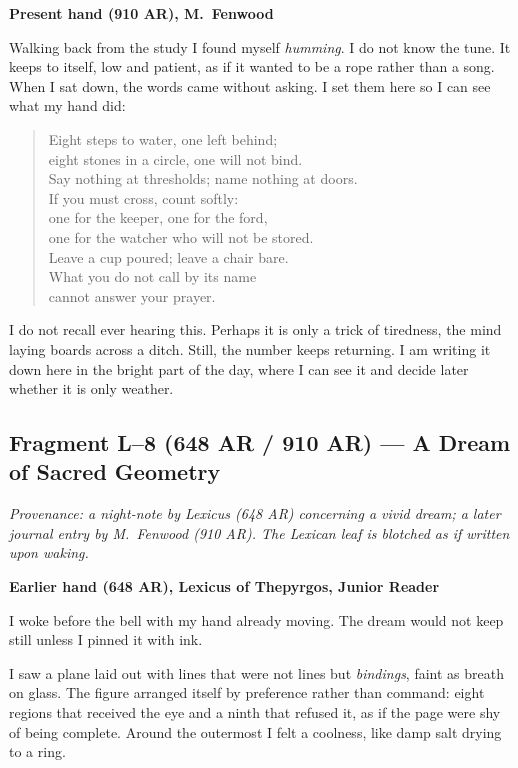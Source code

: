 \documentclass[11pt]{article}
\begin{document}
\medskip
\noindent\textbf{Present hand (910 AR), M.\ Fenwood}

Walking back from the study I found myself \emph{humming}. I do not know the tune. It keeps to itself, low and patient, as if it wanted to be a rope rather than a song. When I sat down, the words came without asking. I set them here so I can see what my hand did:

\begin{verse}
Eight steps to water, one left behind;\\
eight stones in a circle, one will not bind.\\
Say nothing at thresholds; name nothing at doors.\\
If you must cross, count softly:\\
one for the keeper, one for the ford,\\
one for the watcher who will not be stored.\\
Leave a cup poured; leave a chair bare.\\
What you do not call by its name\\
cannot answer your prayer.
\end{verse}

I do not recall ever hearing this. Perhaps it is only a trick of tiredness, the mind laying boards across a ditch. Still, the number keeps returning. I am writing it down here in the bright part of the day, where I can see it and decide later whether it is only weather.

\subsection{Fragment L--8 (648 AR / 910 AR) --- A Dream of Sacred Geometry}
\label{frag:l8}
{}

\noindent\textit{Provenance: a night-note by Lexicus (648 AR) concerning a vivid dream; a later journal entry by M.\ Fenwood (910 AR). The Lexican leaf is blotched as if written upon waking.}

\medskip
\noindent\textbf{Earlier hand (648 AR), Lexicus of Thepyrgos, Junior Reader}

I woke before the bell with my hand already moving. The dream would not keep still unless I pinned it with ink.

I saw a plane laid out with lines that were not lines but \emph{bindings}, faint as breath on glass. The figure arranged itself by preference rather than command: eight regions that received the eye and a ninth that refused it, as if the page were shy of being complete. Around the outermost I felt a coolness, like damp salt drying to a ring.
\end{document}
